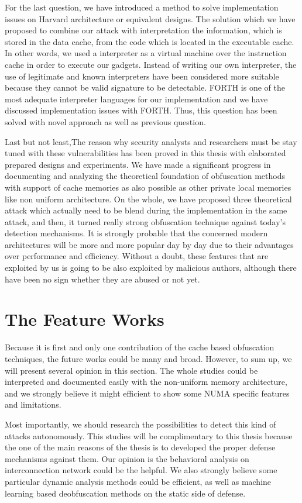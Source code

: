 For the last question, we have introduced a method to solve implementation issues on Harvard architecture or equivalent designs. The solution which we have proposed to combine our attack with interpretation the information, which is stored in the data cache, from the code which is located in the executable cache. In other words, we used a interpreter as a virtual machine over the instruction cache in order to execute our gadgets. Instead of writing our own interpreter, the use of legitimate and known interpreters have been considered more suitable because they cannot be valid signature to be detectable. FORTH is one of the most adequate interpreter languages for our implementation and we have discussed implementation issues with FORTH. Thus, this question has been solved with novel approach as well as previous question.

Last but not least,The reason why security analysts and researchers must be stay tuned with these vulnerabilities has been proved in this thesis with elaborated prepared designs and experiments. We have made a significant progress in documenting and analyzing the theoretical foundation of obfuscation methods with support of cache memories as also possible as other private local memories like non uniform architecture. On the whole, we have proposed three theoretical attack which actually need to be blend during the implementation in the same attack, and then, it turned really strong obfuscation technique against today's detection mechanisms. It is strongly probable that the concerned modern architectures will be more and more popular day by day due to their advantages over performance and efficiency. Without a doubt, these features that are exploited by us is going to be also exploited by malicious authors, although there have been no sign whether they are abused or not yet.

\section*{The Feature Works}

Because it is first and only one contribution of the cache based obfuscation techniques, the future works could be many and broad. However, to sum up, we will present several opinion in this section. The whole studies could be interpreted and documented easily with the non-uniform memory architecture, and we strongly believe it might efficient to show some NUMA specific features and limitations. 

Most importantly, we should research the possibilities to detect this kind of attacks autonomously. This studies will be complimentary to this thesis because the one of the main reasons of the thesis is to developed the proper defense mechanisms against them. Our opinion is the behavioral analysis on interconnection network could be the helpful. We also strongly believe some particular dynamic analysis methods could be efficient, as well as machine learning based deobfuscation methods on the static side of defense. 

